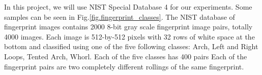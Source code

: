 
In this project, we will use NIST Special Database 4 \cite{nist-db-4} for our experiments. Some samples can be seen in Fig.\ref{fig.fingerprint_classes}.
%
The NIST database of fingerprint images contains 2000 8-bit gray scale fingerprint image pairs, totally 4000 images.
%
Each image is 512-by-512 pixels with 32 rows of white space at the bottom and classified using one of the five following classes: Arch, Left and Right Loops, Tented Arch, Whorl.
%
Each of the five classes has 400 pairs  Each of the fingerprint pairs are two completely different rollings of the same fingerprint.